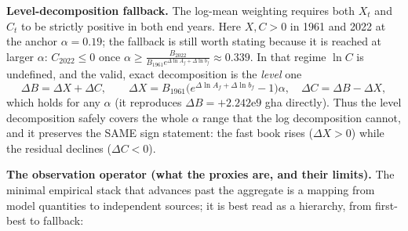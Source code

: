 \documentclass[11pt]{article}
\begin{document}
\noindent\textbf{Level-decomposition fallback.} The log-mean weighting requires both $X_t$ and
$C_t$ to be strictly positive in both end years. Here $X,C>0$ in 1961 and 2022 at the anchor $\alpha=0.19$; the
fallback is still worth stating because it is reached at larger $\alpha$: $C_{2022}\le0$ once $\alpha\ge
\frac{B_{2022}}{B_{1961}e^{\Delta\ln A_f+\Delta\ln b_f}}\approx0.339$. In that regime $\ln C$ is undefined, and
the valid, exact decomposition is the \emph{level} one
\[
\Delta B=\Delta X+\Delta C,\qquad \Delta X=B_{1961}\big(e^{\Delta\ln A_f+\Delta\ln b_f}-1\big)\alpha,\quad
\Delta C=\Delta B-\Delta X ,
\]
which holds for any $\alpha$ (it reproduces $\Delta B=+2.242\text{e}9$ gha directly). Thus the level decomposition
safely covers the whole $\alpha$ range that the log decomposition cannot, and it preserves the SAME sign
statement: the fast book rises ($\Delta X>0$) while the residual declines ($\Delta C<0$).

\noindent\textbf{The observation operator (what the proxies are, and their limits).} The minimal empirical stack
that advances past the aggregate is a mapping from model quantities to independent sources; it is best read as a
hierarchy, from first-best to fallback:
\end{document}
